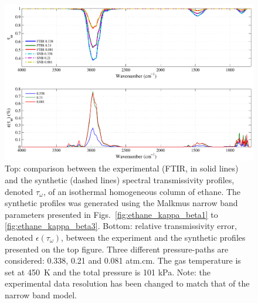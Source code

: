 \begin{figure}[p]
\includegraphics[width=\textwidth]{Figures/Comparison_Fit_Ethane_MALKMUS_Temp450K.pdf}
\caption{Top: comparison between the experimental (FTIR, in solid lines) and the synthetic (dashed lines) spectral transmissivity profiles, denoted $\tau_{\omega}$, of an isothermal homogeneous column of ethane. The synthetic profiles was generated using the Malkmus narrow band parameters presented in Figs.~\ref{fig:ethane_kappa_beta1} to \ref{fig:ethane_kappa_beta3}. Bottom: relative transmissivity error, denoted $\epsilon{(\tau_{\omega})}$, between the experiment and the synthetic profiles presented on the top figure. Three different pressure-paths are considered: 0.338, 0.21 and 0.081 atm.cm. The gas temperature is set at 450~K and the total pressure is 101 kPa. Note: the experimental data resolution has been changed to match that of the narrow band model. \label{fig:ethane_SNBVerify_450K}}
\end{figure}


